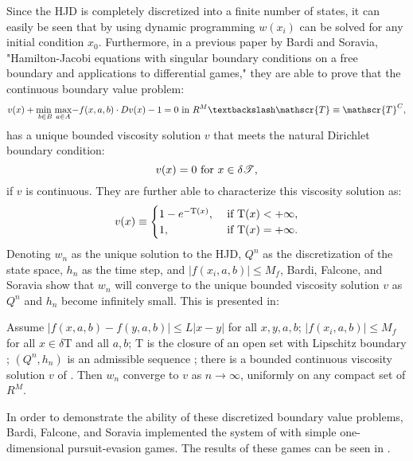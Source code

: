 Since the HJD is completely discretized into a finite number of states, it can easily be seen that by using dynamic programming $w(x_i)$ can be solved for any initial condition $x_0$. Furthermore, in a previous paper by Bardi and Soravia, "Hamilton-Jacobi equations with singular boundary conditions on a free boundary and applications to differential games,"\cite{bardi1} they are able to prove that the continuous boundary value problem:
\begin{equation}\label{eqn1}
v(x) + \underset{b \in B }{\operatorname{min \textnormal{ }}}\underset{a \in A}{\operatorname{max}}{-f(x,a,b)\cdot Dv(x)-1}=0 \textnormal{ in } R^M\textbackslash \mathscr{T} \equiv \mathscr{T}^C,
\end{equation}
has a unique bounded viscosity solution $v$ that meets the natural Dirichlet boundary condition:
\begin{equation}\label{eqn2}
v(x) = 0 \textnormal{ for } x \in \delta \mathscr{T},
\end{equation}
if $v$ is continuous. They are further able to characterize this viscosity solution as:
\begin{equation}\label{eqn3}
v(x) \equiv 
\begin{cases}
1-e^{-\textnormal{T}(x)}, & \textnormal{ if T}(x) < + \infty,\\
1, & \textnormal{ if T}(x) = + \infty.
\end{cases}
\end{equation}
Denoting $w_n$ as the unique solution to the HJD, $Q^n$ as the discretization of the state space, $h_n$ as the time step, and $|f(x_i,a,b)| \leq M_f$, Bardi, Falcone, and Soravia show that $w_n$ will converge to the unique bounded viscosity solution $v$ as $Q^n$ and $h_n$ become infinitely small. This is presented in: 
\begin{theorem}\label{dbvpt}
Assume $|f(x,a,b)-f(y,a,b)| \leq L|x-y|$ for all $x,y,a,b$; $|f(x_i,a,b)| \leq M_f$ for all $x \in \delta$T and all $a,b$; T is the closure of an open set with Lipschitz boundary ; $(Q^n,h_n)$ is an admissible sequence ; there is a bounded continuous viscosity solution $v$ of . Then $w_n$ converge to $v$ as $n \rightarrow \infty$, uniformly on any compact set of $R^M$.   
\end{theorem}
In order to demonstrate the ability of these discretized boundary value problems, Bardi, Falcone, and Soravia implemented the system of  with simple one-dimensional pursuit-evasion games. The results of these games can be seen in .\cite{bardi2}
